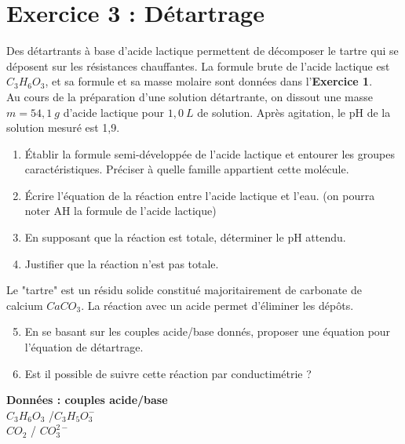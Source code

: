 \documentclass[a4paper,11pt,fleqn]{article}
\begin{document}
\section*{Exercice 3 : Détartrage}
Des détartrants à base d’acide lactique permettent de décomposer le tartre qui se déposent sur les résistances chauffantes.
La formule brute de l’acide lactique est $C_3H_6O_3$, et sa formule et sa masse molaire sont données dans l'\textbf{Exercice 1}.\\
Au cours de la préparation d’une solution détartrante, on dissout une masse $m = 54,1~g$ d’acide lactique pour $1,0~L$ de solution. Après agitation, le pH de la solution mesuré est 1,9.
\begin{enumerate}
\item Établir la formule semi-développée de l’acide lactique et entourer les groupes caractéristiques. Préciser à quelle famille appartient cette molécule.

\item Écrire l’équation de la réaction entre l’acide lactique et l’eau. (on pourra noter AH la formule de l’acide lactique)

\item En supposant que la réaction est totale, déterminer le pH attendu.

\item Justifier que la réaction n’est pas totale.
\end{enumerate}
Le "tartre" est un résidu solide constitué majoritairement de carbonate de calcium $CaCO_3$. La réaction avec un acide permet d'éliminer les dépôts.
\begin{enumerate}
\setcounter{enumi}{4}
\item En se basant sur les couples acide/base donnés, proposer une équation pour l'équation de détartrage.
\item Est il possible de suivre cette réaction par conductimétrie ?
\end{enumerate}
\textbf{Données : couples acide/base} \\
$C_3H_6O_3$ /$C_3H_5O_3^{-}$\\
$CO_2$ / $CO_3^{2-}$
\end{document}
